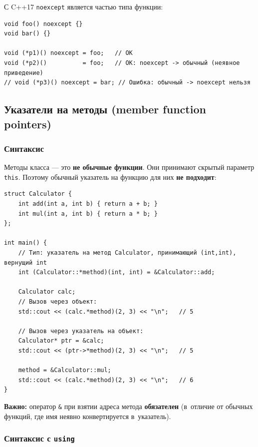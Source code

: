 \documentclass[a4paper,12pt]{article}
\begin{document}
С C++17 \texttt{noexcept} является частью типа функции:

\begin{lstlisting}
void foo() noexcept {}
void bar() {}

void (*p1)() noexcept = foo;   // OK
void (*p2)()          = foo;   // OK: noexcept -> обычный (неявное приведение)
// void (*p3)() noexcept = bar; // Ошибка: обычный -> noexcept нельзя
\end{lstlisting}

\subsection{Указатели на методы (member function pointers)}

\subsubsection{Синтаксис}

Методы класса --- это \textbf{не обычные функции}. Они принимают скрытый
параметр \texttt{this}. Поэтому обычный указатель на функцию для них
\textbf{не подходит}:

\begin{lstlisting}
struct Calculator {
    int add(int a, int b) { return a + b; }
    int mul(int a, int b) { return a * b; }
};

int main() {
    // Тип: указатель на метод Calculator, принимающий (int,int), вернущий int
    int (Calculator::*method)(int, int) = &Calculator::add;

    Calculator calc;
    // Вызов через объект:
    std::cout << (calc.*method)(2, 3) << "\n";   // 5

    // Вызов через указатель на объект:
    Calculator* ptr = &calc;
    std::cout << (ptr->*method)(2, 3) << "\n";   // 5

    method = &Calculator::mul;
    std::cout << (calc.*method)(2, 3) << "\n";   // 6
}
\end{lstlisting}

\textbf{Важно:} оператор \texttt{\&} при взятии адреса метода \textbf{обязателен}
(в~отличие от обычных функций, где имя неявно конвертируется в~указатель).

\subsubsection{Синтаксис с \texttt{using}}
\end{document}

